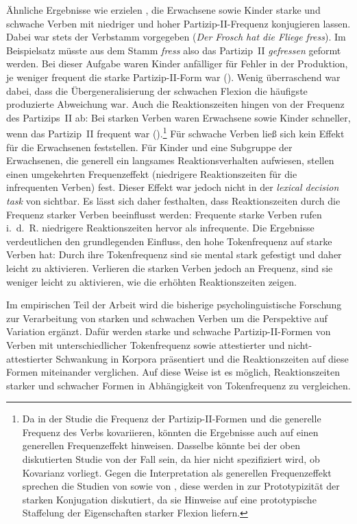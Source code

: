  

Ähnliche Ergebnisse wie \textcite{Clahsen.1997} erzielen \textcite[692--964]{Clahsen.2004}, die Erwachsene sowie Kinder starke und schwache Verben mit niedriger und hoher Partizip-II-Frequenz konjugieren lassen. Dabei war stets der Verbstamm vorgegeben (\textit{Der Frosch hat die Fliege fress}). Im Beispielsatz müsste aus dem Stamm \textit{fress} also das Partizip~II \textit{gefressen} geformt werden. Bei dieser Aufgabe waren Kinder anfälliger für Fehler in der Produktion, je weniger frequent die starke Partizip-II-Form war (\cite[695--696]{Clahsen.2004}). Wenig überraschend war dabei, dass die Übergeneralisierung der schwachen Flexion die häufigste produzierte Abweichung war. Auch die Reaktionszeiten hingen von der Frequenz des Partizips~II ab: Bei starken Verben waren Erwachsene sowie Kinder schneller, wenn das Partizip~II frequent war (\cite[698--700]{Clahsen.2004}).\footnote{Da in der Studie die Frequenz der Partizip-II-Formen und die generelle Frequenz des Verbs kovariieren, könnten die Ergebnisse auch auf einen generellen Frequenzeffekt hinweisen. Dasselbe könnte bei der oben diskutierten Studie von \textcite[224--227]{Clahsen.1997} der Fall sein, da hier nicht spezifiziert wird, ob Kovarianz vorliegt. Gegen die Interpretation als generellen Frequenzeffekt sprechen die Studien von \textcite[227--231]{Clahsen.1997} sowie von \textcite{Clahsen.2001}, diese werden in  zur Prototypizität der starken Konjugation diskutiert, da sie Hinweise auf eine prototypische Staffelung der Eigenschaften starker Flexion liefern.} Für schwache Verben ließ sich kein Effekt für die Erwachsenen feststellen. Für Kinder und eine Subgruppe der Erwachsenen, die generell ein langsames Reaktionsverhalten aufwiesen, stellen \textcite[701]{Clahsen.2004} einen umgekehrten Frequenzeffekt (niedrigere Reaktionszeiten für die infrequenten Verben) fest. Dieser Effekt war jedoch nicht in der \textit{lexical decision task} von \textcite{Clahsen.1997} sichtbar. Es lässt sich daher festhalten, dass Reaktionszeiten durch die Frequenz starker Verben beeinflusst werden: Frequente starke Verben rufen i.~d.~R. niedrigere Reaktionszeiten hervor als infrequente.  Die Ergebnisse verdeutlichen den grundlegenden Einfluss, den hohe Tokenfrequenz auf starke Verben hat: Durch ihre Tokenfrequenz sind sie mental stark gefestigt und daher leicht zu aktivieren. Verlieren die starken Verben jedoch an Frequenz, sind sie weniger leicht zu aktivieren, wie die erhöhten Reaktionszeiten zeigen.


Im empirischen Teil der Arbeit wird die bisherige psycholinguistische Forschung zur Verarbeitung von starken und schwachen Verben um die Perspektive auf Variation ergänzt. Dafür werden starke und schwache Partizip-II-Formen von Verben mit unterschiedlicher Tokenfrequenz sowie at\-tes\-tier\-ter und nicht-attestierter Schwankung in Korpora präsentiert und die Reaktionszeiten auf diese Formen miteinander verglichen. Auf diese Weise ist es möglich, Reaktionszeiten starker und schwacher Formen in Abhängigkeit von Tokenfrequenz zu vergleichen. 

